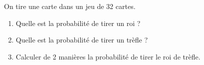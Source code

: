 
On tire une carte dans un jeu de 32 cartes.
\begin{enumerate}
\item Quelle est la probabilité de tirer un roi ?
\item Quelle est la probabilité de tirer un trèfle ?
\item Calculer de 2 manières la probabilité de tirer le roi de trèfle.
\end{enumerate}